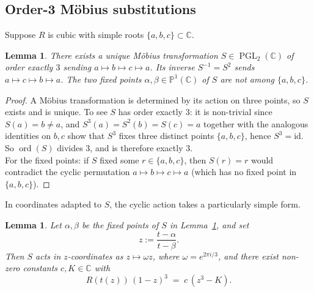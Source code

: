 \documentclass[11pt,a4paper]{article}
\theoremstyle{plain}
\newtheorem{lemma}[theorem]{Lemma}
\theoremstyle{definition}
\theoremstyle{remark}
\newcommand{\C}{\mathbb{C}}
\newcommand{\PGL}{\operatorname{PGL}}
\begin{document}
\subsection{Order-3 M\"obius substitutions}

Suppose $R$ is cubic with simple roots $\{a,b,c\}\subset\C$.

\begin{lemma}\label{lem:cyclic-mobius}
There exists a unique M\"obius transformation $S\in\PGL_2(\C)$ of order exactly $3$ sending $a\mapsto b\mapsto c\mapsto a$. Its inverse $S^{-1}=S^2$ sends $a\mapsto c\mapsto b\mapsto a$. The two fixed points $\alpha,\beta\in\mathbb{P}^1(\C)$ of $S$ are not among $\{a,b,c\}$.
\end{lemma}

\begin{proof}
A M\"obius transformation is determined by its action on three points, so $S$ exists and is unique. To see $S$ has order exactly $3$: it is non-trivial since $S(a)=b\neq a$, and $S^3(a)=S^2(b)=S(c)=a$ together with the analogous identities on $b,c$ show that $S^3$ fixes three distinct points $\{a,b,c\}$, hence $S^3=\mathrm{id}$. So $\operatorname{ord}(S)$ divides $3$, and is therefore exactly $3$.\\

For the fixed points: if $S$ fixed some $r\in\{a,b,c\}$, then $S(r)=r$ would contradict the cyclic permutation $a\mapsto b\mapsto c\mapsto a$ (which has no fixed point in $\{a,b,c\}$).
\end{proof}

In coordinates adapted to $S$, the cyclic action takes a particularly simple form.

\begin{lemma}\label{lem:cyclic-canonical}
Let $\alpha,\beta$ be the fixed points of $S$ in Lemma~\ref{lem:cyclic-mobius}, and set
\[
  z := \frac{t-\alpha}{t-\beta}.
\]
Then $S$ acts in $z$-coordinates as $z\mapsto \omega z$, where $\omega=e^{2\pi i/3}$, and there exist non-zero constants $c,K\in\C$ with
\begin{equation}\label{eq:R-as-z3-K}
  R(t(z))\,(1-z)^3 \;=\; c\,(z^3 - K).
\end{equation}
\end{lemma}
\end{document}
